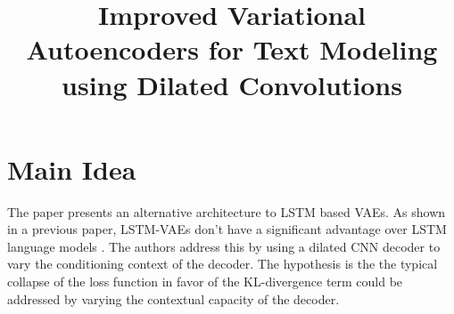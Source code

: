 \documentclass[12pt]{scrartcl}
\begin{document}
\title{Improved Variational Autoencoders for Text Modeling using Dilated Convolutions}
\author{}
\date{}
\maketitle

\section{Main Idea}
  The paper \cite{yang2017improved} presents an alternative architecture to LSTM based VAEs. As shown in a previous paper, LSTM-VAEs don't have a significant advantage over LSTM language models \cite{bowman2016generating}. The authors address this by using a dilated CNN decoder to vary the conditioning context of the decoder. The hypothesis is the the typical collapse of the loss function in favor of the KL-divergence term could be addressed by varying the contextual capacity of the decoder.
\end{document}
